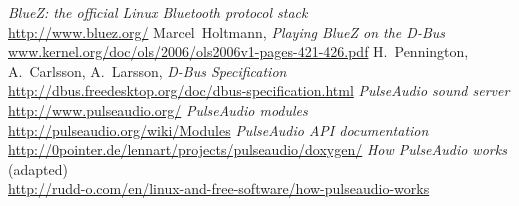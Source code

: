 \documentclass{IEEEtran}
\begin{document}
\begin{thebibliography}{1}
	\emph{BlueZ: the official Linux Bluetooth protocol stack} \\
	\url{http://www.bluez.org/}
	Marcel~Holtmann,
	\emph{Playing BlueZ on the D-Bus} \\
	\url{www.kernel.org/doc/ols/2006/ols2006v1-pages-421-426.pdf}
	H.~Pennington, A.~Carlsson, A.~Larsson,
	\emph{D-Bus Specification} \\
	\url{http://dbus.freedesktop.org/doc/dbus-specification.html}
	\emph{PulseAudio sound server} \\
	\url{http://www.pulseaudio.org/}
	\emph{PulseAudio modules} \\
	\url{http://pulseaudio.org/wiki/Modules}
	\emph{PulseAudio API documentation} \\
	\url{http://0pointer.de/lennart/projects/pulseaudio/doxygen/}
	\emph{How PulseAudio works} (adapted) \\
	\url{http://rudd-o.com/en/linux-and-free-software/how-pulseaudio-works}
\end{thebibliography}
\end{document}

